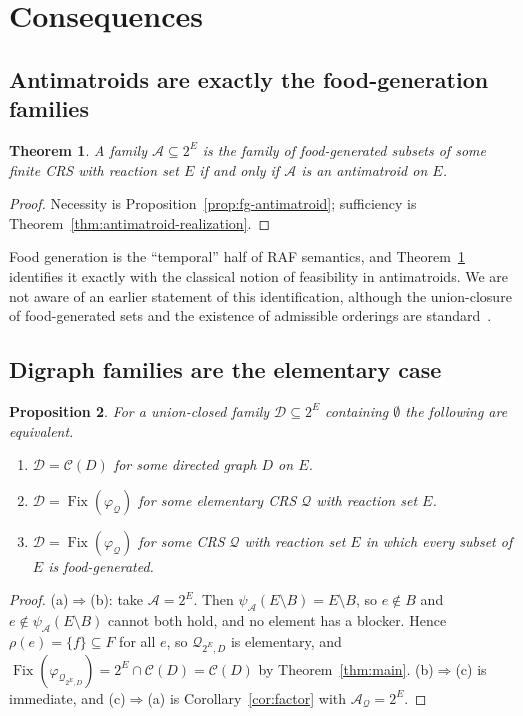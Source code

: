 \documentclass[11pt,a4paper]{article}
\theoremstyle{plain}
\newtheorem{theorem}{Theorem}[section]
\newtheorem{proposition}[theorem]{Proposition}
\theoremstyle{definition}
\theoremstyle{remark}
\newcommand{\Fix}{\operatorname{Fix}}
\newcommand{\cA}{\mathcal{A}}
\newcommand{\cC}{\mathcal{C}}
\newcommand{\cD}{\mathcal{D}}
\newcommand{\cQ}{\mathcal{Q}}
\newcommand{\pw}[1]{2^{#1}}
\begin{document}
\section{Consequences}\label{sec:consequences}

\subsection{Antimatroids are exactly the food-generation families}

\begin{theorem}\label{thm:antimatroid-fg}
A family $\cA\subseteq\pw{E}$ is the family of food-generated subsets of some finite CRS with reaction set $E$ if and only if $\cA$ is an antimatroid on $E$.
\end{theorem}

\begin{proof}
Necessity is Proposition~\ref{prop:fg-antimatroid}; sufficiency is Theorem~\ref{thm:antimatroid-realization}.
\end{proof}

Food generation is the ``temporal'' half of RAF semantics, and Theorem~\ref{thm:antimatroid-fg} identifies it exactly with the classical notion of feasibility in antimatroids. We are not aware of an earlier statement of this identification, although the union-closure of food-generated sets and the existence of admissible orderings are standard~\cite{hordijk2004detecting,steel2019autocatalytic}.

\subsection{Digraph families are the elementary case}

\begin{proposition}\label{prop:elementary}
For a union-closed family $\cD\subseteq\pw{E}$ containing $\emptyset$ the following are equivalent.
\begin{enumerate}[label=(\alph*)]
\item $\cD=\cC(D)$ for some directed graph $D$ on $E$.
\item $\cD=\Fix(\varphi_{\cQ})$ for some elementary CRS $\cQ$ with reaction set $E$.
\item $\cD=\Fix(\varphi_{\cQ})$ for some CRS $\cQ$ with reaction set $E$ in which every subset of $E$ is food-generated.
\end{enumerate}
\end{proposition}

\begin{proof}
(a)$\Rightarrow$(b): take $\cA=\pw{E}$. Then $\psi_{\cA}(E\setminus B)=E\setminus B$, so $e\notin B$ and $e\notin\psi_{\cA}(E\setminus B)$ cannot both hold, and no element has a blocker. Hence $\rho(e)=\{f\}\subseteq F$ for all $e$, so $\cQ_{\pw{E},D}$ is elementary, and $\Fix(\varphi_{\cQ_{\pw{E},D}})=\pw{E}\cap\cC(D)=\cC(D)$ by Theorem~\ref{thm:main}. (b)$\Rightarrow$(c) is immediate, and (c)$\Rightarrow$(a) is Corollary~\ref{cor:factor} with $\cA_{\cQ}=\pw{E}$.
\end{proof}
\end{document}
